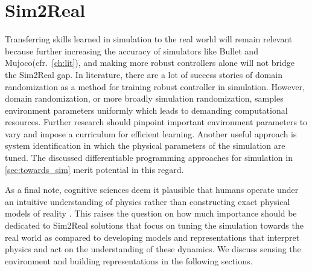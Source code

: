 \documentclass[\home/main.tex]{subfiles}
\begin{document}
\section{Sim2Real}
Transferring skills learned in simulation to the real world will remain relevant because further increasing the accuracy of simulators like Bullet and Mujoco(cfr.\ \cref{ch:lit}), and making more robust controllers alone will not bridge the Sim2Real gap. In literature, there are a lot of success stories of domain randomization as a method for training robust controller in simulation. However, domain randomization, or more broadly simulation randomization, samples environment parameters uniformly which leads to demanding computational resources. Further research should pinpoint important environment parameters to vary and impose a curriculum for efficient learning. Another useful approach is system identification in which the physical parameters of the simulation are tuned. The discussed differentiable programming approaches for simulation in \cref{sec:towards_sim} merit potential in this regard. 

As a final note, cognitive sciences deem it plausible that humans operate under an intuitive understanding of physics rather than constructing exact physical models of reality \autocite{Baillargeon2011}. This raises the question on how much importance should be dedicated to Sim2Real solutions that focus on tuning the simulation towards the real world as compared to developing models and representations that interpret physics and act on the understanding of these dynamics. We discuss sensing the environment and building representations in the following sections.  
\end{document}
